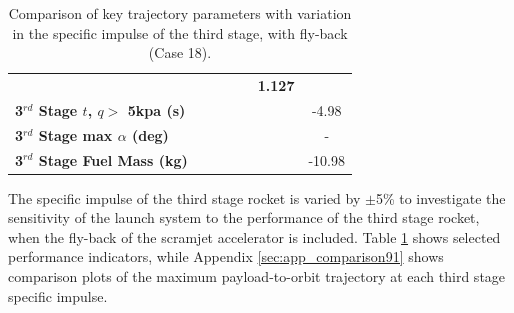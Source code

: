 \begin{table}[ht]
\begin{tabular}{l c c c c c c}
		& \textbf{\thirddExergyEffISPThreeNinetyFive}
		& \textbf{\thirddExergyEffISPThreeStandard}
		& \textbf{\thirddExergyEffISPThreeOneHundredFive}
		& \textbf{\thirddExergyEffISPThreeOneHundredTen}
		& \textbf{1.127}
		\\
		\textbf{3$^{rd}$ Stage $t$, $q >$ 5kpa (s)}
		& \thirdqOverFiveISPThreeNinety
		& \thirdqOverFiveISPThreeNinetyFive
		& \thirdqOverFiveISPThreeStandard
		& \thirdqOverFiveISPThreeOneHundredFive
		& \thirdqOverFiveISPThreeOneHundredTen
		&-4.98
		\\
		\textbf{3$^{rd}$ Stage max $\alpha$ (deg)}
		& \thirdmaxAoAISPThreeNinety
		& \thirdmaxAoAISPThreeNinetyFive
		& \thirdmaxAoAISPThreeStandard
		& \thirdmaxAoAISPThreeOneHundredFive
		& \thirdmaxAoAISPThreeOneHundredTen
		& -
		\\
		\textbf{3$^{rd}$ Stage Fuel Mass (kg)}
		& \thirdmFuelISPThreeNinety
		& \thirdmFuelISPThreeNinetyFive
		& \thirdmFuelISPThreeStandard
		& \thirdmFuelISPThreeOneHundredFive
		& \thirdmFuelISPThreeOneHundredTen
		&-10.98
		\\
		\hline 
	\end{tabular} 
	\caption{Comparison of key trajectory parameters with variation in the specific impulse of the third stage, with fly-back (Case 18).}
	\label{tab:isp3}
\end{table}

The specific impulse of the third stage rocket is varied by $\pm$5\% to investigate the sensitivity of the launch system to the performance of the third stage rocket, when the fly-back of the scramjet accelerator is included. 
Table \ref{tab:isp3} shows selected performance indicators, while Appendix \ref{sec:app_comparison91} shows comparison plots of the maximum payload-to-orbit trajectory at each third stage specific impulse. 

